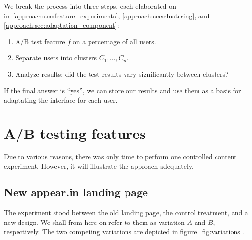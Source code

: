 We break the process into three steps, each elaborated on in~\ref{approach:sec:feature_experiments}, \ref{approach:sec:clustering}, and \ref{approach:sec:adaptation_component}:

\begin{enumerate}
  \item A/B test feature $f$ on a percentage of all users.
  \item Separate users into clusters $C_1, \ldots, C_n$.
  \item Analyze results: did the test results vary significantly between clusters?
\end{enumerate}

If the final answer is ``yes'', we can store our results and use them as a basis for adaptating the interface for each user.

\section{A/B testing features} %
\label{eval:sec:ab_testing_features}

Due to various reasons, there was only time to perform one controlled content experiment. However, it will illustrate the approach adequately.

\subsection{New appear.in landing page}
\label{eval:sub:new_landing_page}

The experiment stood between the old landing page, the control treatment, and a new design. We shall from here on refer to them as variation $A$ and $B$, respectively. The two competing variations are depicted in figure~\ref{fig:variations}.

